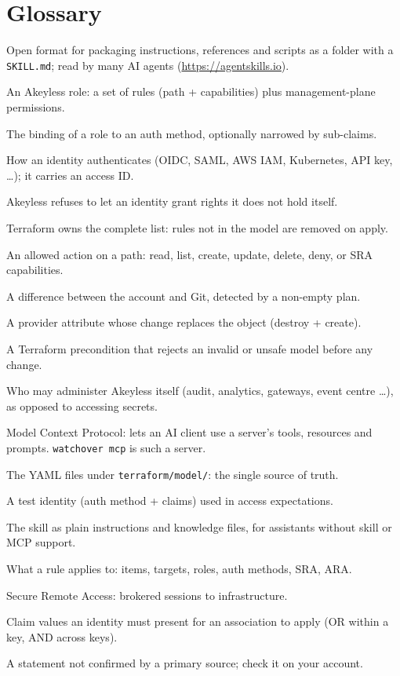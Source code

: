 \chapter{Glossary}\label{app:glossary}
\begin{description}[style=nextline,leftmargin=1.5em,font=\normalfont\bfseries]
\item[Agent Skills] Open format for packaging instructions, references and scripts as a folder with a \texttt{SKILL.md}; read by many AI agents (\url{https://agentskills.io}).
\item[Access role] An Akeyless role: a set of rules (path + capabilities) plus management-plane permissions.
\item[Association] The binding of a role to an auth method, optionally narrowed by sub-claims.
\item[Auth method] How an identity authenticates (OIDC, SAML, AWS IAM, Kubernetes, API key, \ldots); it carries an access ID.
\item[Anti-escalation] Akeyless refuses to let an identity grant rights it does not hold itself.
\item[Authoritative] Terraform owns the complete list: rules not in the model are removed on apply.
\item[Capability] An allowed action on a path: read, list, create, update, delete, deny, or SRA capabilities.
\item[Drift] A difference between the account and Git, detected by a non-empty plan.
\item[ForceNew] A provider attribute whose change replaces the object (destroy + create).
\item[Guard] A Terraform precondition that rejects an invalid or unsafe model before any change.
\item[Management plane] Who may administer Akeyless itself (audit, analytics, gateways, event centre \ldots), as opposed to accessing secrets.
\item[MCP] Model Context Protocol: lets an AI client use a server's tools, resources and prompts. \texttt{watchover mcp} is such a server.
\item[Model] The YAML files under \texttt{terraform/model/}: the single source of truth.
\item[Persona] A test identity (auth method + claims) used in access expectations.
\item[Prompt pack] The skill as plain instructions and knowledge files, for assistants without skill or MCP support.
\item[Rule type] What a rule applies to: items, targets, roles, auth methods, SRA, ARA.
\item[SRA] Secure Remote Access: brokered sessions to infrastructure.
\item[Sub-claims] Claim values an identity must present for an association to apply (OR within a key, AND across keys).
\item[VERIFY] A statement not confirmed by a primary source; check it on your account.
\end{description}

